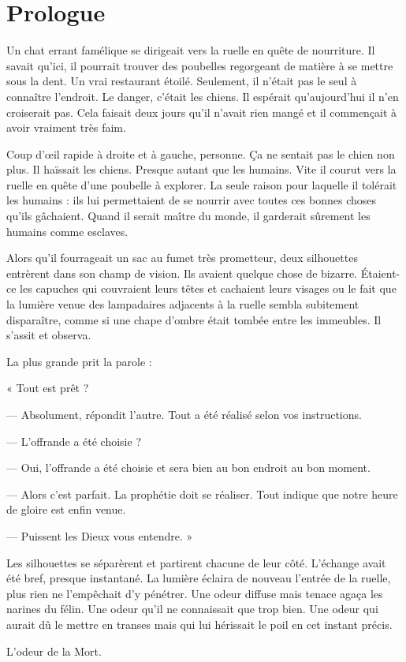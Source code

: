 \chapter*[Prologue]{Prologue}
Un chat errant famélique se dirigeait vers la ruelle en quête de nourriture. Il savait qu'ici, il pourrait trouver des 
poubelles regorgeant de matière à se mettre sous la dent. Un vrai restaurant étoilé. Seulement, il n'était pas le 
seul à connaître l'endroit. Le danger, c'était les chiens. Il espérait qu'aujourd'hui il n'en croiserait pas. Cela 
faisait deux jours qu'il n'avait rien mangé et il commençait à avoir vraiment très faim.

Coup d'œil rapide à droite et à gauche, personne. Ça ne sentait pas le chien non plus. Il haïssait les chiens. 
Presque autant que les humains. Vite il courut  vers la ruelle en quête d'une poubelle à explorer. La seule raison 
pour laquelle il tolérait les humains : ils lui permettaient de se nourrir avec toutes ces bonnes choses qu'ils 
gâchaient. Quand il serait maître du monde, il garderait sûrement les humains comme esclaves. 

Alors qu'il fourrageait un sac au fumet très prometteur, deux silhouettes entrèrent dans son champ de vision. Ils 
avaient quelque chose de bizarre. Étaient-ce les capuches qui couvraient leurs têtes et cachaient leurs visages ou
 le fait que la lumière venue des lampadaires adjacents à la ruelle sembla subitement disparaître, comme si une chape 
d'ombre était tombée entre les immeubles. Il s'assit et observa.

La plus grande prit la parole :

« Tout est prêt ?

— Absolument, répondit l'autre. Tout a été réalisé selon vos instructions.

— L'offrande a été choisie ?

— Oui, l'offrande a été choisie et sera bien au bon endroit au bon moment. 

— Alors c'est parfait. La prophétie doit se réaliser. Tout indique que notre heure de gloire est enfin venue. 

— Puissent les Dieux vous entendre. »

Les silhouettes se séparèrent et partirent chacune de leur côté. L'é\-change avait été bref, presque instantané. La 
lumière éclaira de nouveau l'entrée de la ruelle, plus rien ne l'empêchait d'y pénétrer. Une odeur diffuse mais tenace 
agaça les narines du félin. Une odeur qu'il ne connaissait que trop bien. Une odeur qui aurait dû le mettre en transes 
mais qui lui hérissait le poil en cet instant précis.

L'odeur de la Mort.
